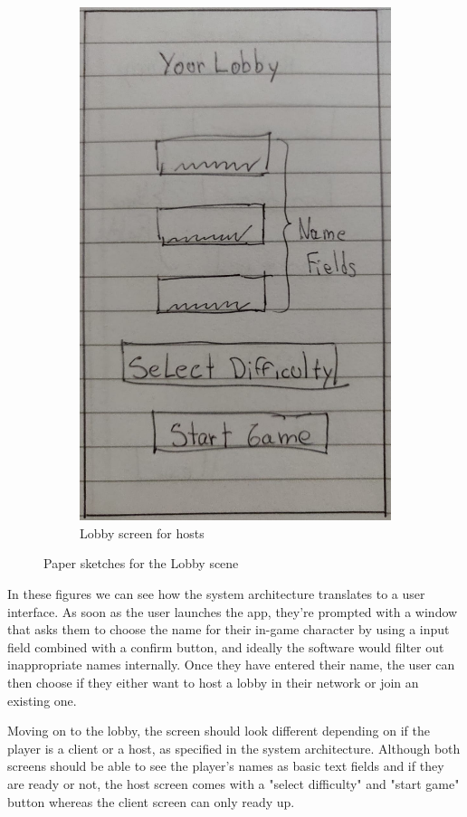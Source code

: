 \documentclass{dissertation}
\begin{document}
\begin{figure}[H]
\begin{subfigure}[h]{.5\textwidth}
\includegraphics[width = .8\linewidth]{images/paper-prototype4.jpeg}
\caption{Lobby screen for hosts}
\label{fig:pp4}
\end{subfigure}
\caption{Paper sketches for the Lobby scene}
\label{fig:lobby-menu}
\end{figure}

In these figures we can see how the system architecture translates to a user interface. As soon as the user launches the app, they're prompted with a window that asks them to choose the name for their in-game character by using a input field combined with a confirm button, and ideally the software would filter out inappropriate names internally. Once they have entered their name, the user can then choose if they either want to host a lobby in their network or join an existing one.

Moving on to the lobby, the screen should look different depending on if the player is a client or a host, as specified in the system architecture. Although both screens should be able to see the player's names as basic text fields and if they are ready or not, the host screen comes with a "select difficulty" and "start game" button whereas the client screen can only ready up.
\end{document}
